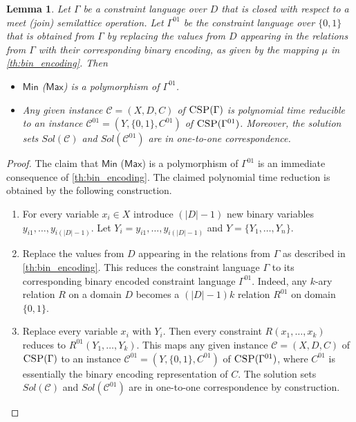 \documentclass[11pt]{article}
\newcommand{\Cc}{\mathcal{C}}
\newcommand{\CSP}{\textsc{CSP}}
\newcommand{\Max}{\textsf{Max}}
\newcommand{\Min}{\textsf{Min}}
\newcommand{\1}{\textbf{1}}
\newcommand\uval{{(|D|-1)}}
\newtheorem{lemma}[theorem]{Lemma}
\begin{document}
\begin{lemma}\label{th:reduction_csp}
Let $\Gamma$ be a constraint language over $D$ that is closed with respect to a meet (join) semilattice operation. Let $\Gamma^{01}$ be the constraint language over $\{0,1\}$ that is obtained from $\Gamma$ by replacing the values from $D$ appearing in the relations from $\Gamma$ with their corresponding binary encoding, as given by the mapping $\mu$ in \cref{th:bin_encoding}. Then 
\begin{itemize}
    \item $\Min$ ($\Max$) is a polymorphism of $\Gamma^{01}$.
    \item Any given instance $\Cc=(X,D,C)$ of $\CSP(\Gamma)$ is polynomial time reducible to an instance $\Cc^{01}=(Y,\{0,1\},C^{01})$ of $\CSP(\Gamma^{01})$. Moreover, the solution sets $Sol(\Cc)$ and $Sol(\Cc^{01})$ are in one-to-one correspondence.  
\end{itemize} 
\end{lemma}
\begin{proof}
The claim that $\Min$ ($\Max$) is a polymorphism of $\Gamma^{01}$ is an immediate consequence of \cref{th:bin_encoding}. The claimed polynomial time reduction is obtained by the following construction.
\begin{enumerate} 
    \item For every variable $x_i\in X$ introduce $\uval$ new binary variables $y_{i1},\ldots, y_{i\uval}$. Let $Y_i=y_{i1},\ldots, y_{i\uval}$ and $Y=\{Y_1,\ldots, Y_n\}$.
    \item Replace the values from $D$ appearing in the relations from $\Gamma$ as described in \cref{th:bin_encoding}. This reduces the constraint language $\Gamma$ to its corresponding binary encoded constraint language $\Gamma^{01}$. 
    Indeed, any $k$-ary relation $R$ on a domain $D$ becomes a $\uval k$ relation $R^{01}$ on domain $\{0,1\}$.
    \item Replace every variable $x_i$ with $Y_i$. Then every constraint $R(x_1,\ldots, x_k)$ reduces to $R^{01}(Y_1,\ldots, Y_k)$.
    This maps any given instance $\Cc=(X,D,C)$ of $\CSP(\Gamma)$ to an instance $\Cc^{01}=(Y,\{0,1\},C^{01})$ of $\CSP(\Gamma^{01})$, where $C^{01}$ is essentially the binary encoding representation of $C$. The solution sets $Sol(\Cc)$ and $Sol(\Cc^{01})$ are in one-to-one correspondence by construction. 
\end{enumerate}    
\end{proof}
%
\end{document}
